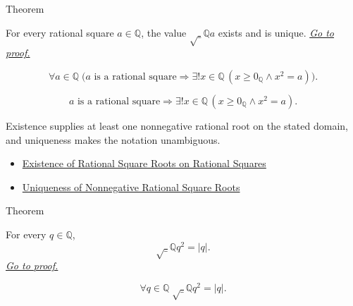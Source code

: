 \begin{theorembox}{Theorem}
\begin{theorem}
\label{thm:rational-square-root-well-defined}
For every rational square $a\in\mathbb{Q}$, the value
$\sqrt_{\mathbb{Q}}{a}$ exists and is unique.
\hyperref[prf:rational-square-root-well-defined]{\textit{Go to proof.}}
\end{theorem}
\end{theorembox}

\begin{remark*}
\[
\forall a\in\mathbb{Q}\;
\bigl(\text{$a$ is a rational square}
\Rightarrow
\exists!x\in\mathbb{Q}\,(x\ge0_{\mathbb{Q}}\land x^2=a)\bigr).
\]
\end{remark*}

\begin{remark*}
\[
\text{$a$ is a rational square}
\Rightarrow
\exists!x\in\mathbb{Q}\,(x\ge0_{\mathbb{Q}}\land x^2=a).
\]
\end{remark*}

\begin{remark*}[Interpretation]
Existence supplies at least one nonnegative rational root on the stated
domain, and uniqueness makes the notation unambiguous.
\end{remark*}

\begin{dependencies}
\begin{itemize}
  \item \hyperref[thm:rational-square-root-exists-on-rational-squares]{Existence of Rational Square Roots on Rational Squares}
  \item \hyperref[thm:uniqueness-of-nonnegative-rational-square-roots]{Uniqueness of Nonnegative Rational Square Roots}
\end{itemize}
\end{dependencies}

\begin{theorembox}{Theorem}
\begin{theorem}
\label{thm:rational-square-root-of-square}
For every $q\in\mathbb{Q}$,
\[
\sqrt_{\mathbb{Q}}{q^2}=|q|.
\]
\hyperref[prf:rational-square-root-of-square]{\textit{Go to proof.}}
\end{theorem}
\end{theorembox}

\begin{remark*}
\[
\forall q\in\mathbb{Q}\; \sqrt_{\mathbb{Q}}{q^2}=|q|.
\]
\end{remark*}

